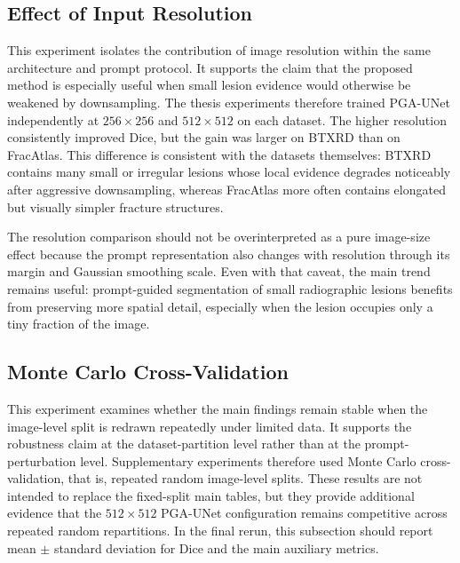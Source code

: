 \documentclass{ieeeaccess}
\begin{document}
\subsection{Effect of Input Resolution}
This experiment isolates the contribution of image resolution within the same architecture and prompt protocol. It supports the claim that the proposed method is especially useful when small lesion evidence would otherwise be weakened by downsampling. The thesis experiments therefore trained PGA-UNet independently at $256\times256$ and $512\times512$ on each dataset. The higher resolution consistently improved Dice, but the gain was larger on BTXRD than on FracAtlas. This difference is consistent with the datasets themselves: BTXRD contains many small or irregular lesions whose local evidence degrades noticeably after aggressive downsampling, whereas FracAtlas more often contains elongated but visually simpler fracture structures.

\begin{table}
\caption{PGA-UNet Dice under covering and off-center prompts at two resolutions.}
\label{tab:resolution}
\centering
{}
\end{table}

The resolution comparison should not be overinterpreted as a pure image-size effect because the prompt representation also changes with resolution through its margin and Gaussian smoothing scale. Even with that caveat, the main trend remains useful: prompt-guided segmentation of small radiographic lesions benefits from preserving more spatial detail, especially when the lesion occupies only a tiny fraction of the image.


\subsection{Monte Carlo Cross-Validation}
This experiment examines whether the main findings remain stable when the image-level split is redrawn repeatedly under limited data. It supports the robustness claim at the dataset-partition level rather than at the prompt-perturbation level. Supplementary experiments therefore used Monte Carlo cross-validation, that is, repeated random image-level splits. These results are not intended to replace the fixed-split main tables, but they provide additional evidence that the $512\times512$ PGA-UNet configuration remains competitive across repeated random repartitions. In the final rerun, this subsection should report mean $\pm$ standard deviation for Dice and the main auxiliary metrics.
\end{document}

